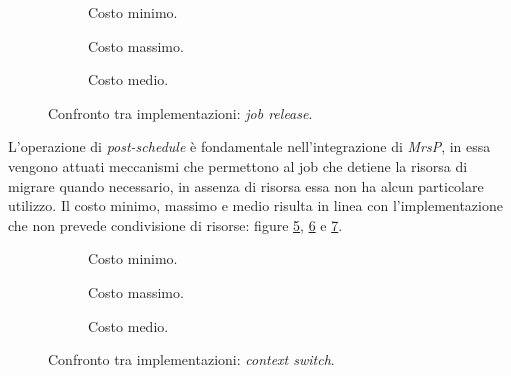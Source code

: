  \begin{figure}[htb]
    \centering
      \begin{subfigure}[b]{0.49\textwidth}
        \centering
        \resizebox{\linewidth}{!}\graficoReleaseMIN  
        \caption{Costo minimo.}
        \label{fig:releaseMin}
      \end{subfigure}
      \begin{subfigure}[b]{0.49\textwidth}
        \centering
        \resizebox{\linewidth}{!}\graficoReleaseMAX
        \caption{Costo massimo.}
        \label{fig:releaseMax}
      \end{subfigure}
      \begin{subfigure}[b]{0.49\textwidth}
        \centering
        \resizebox{\linewidth}{!}\graficoReleaseAVG
        \caption{Costo medio.}
        \label{fig:releaseAvg}
      \end{subfigure}

    \caption{Confronto tra implementazioni: \textit{job release}.}
    \label{fig:release}
  \end{figure}
        
\noindent L'operazione di \textit{post-schedule} è fondamentale nell'integrazione di \textit{MrsP}, in essa vengono attuati meccanismi che permettono al job che detiene la risorsa di migrare quando necessario, in assenza di risorsa essa non ha alcun particolare utilizzo. Il costo minimo, massimo e medio risulta in linea con l'implementazione che non prevede condivisione di risorse: figure \ref{fig:cxsMin}, \ref{fig:cxsMax} e \ref{fig:cxsAvg}.\\

  \begin{figure}[htb]
    \centering
      \begin{subfigure}[b]{0.49\textwidth}
        \centering
        \resizebox{\linewidth}{!}\graficoCxsMIN  
        \caption{Costo minimo.}
        \label{fig:cxsMin}
      \end{subfigure}
      \begin{subfigure}[b]{0.49\textwidth}
        \centering
        \resizebox{\linewidth}{!}\graficoCxsMAX
        \caption{Costo massimo.}
        \label{fig:cxsMax}
      \end{subfigure}
      \begin{subfigure}[b]{0.49\textwidth}
        \centering
        \resizebox{\linewidth}{!}\graficoCxsAVG
        \caption{Costo medio.}
        \label{fig:cxsAvg}
      \end{subfigure}

    \caption{Confronto tra implementazioni: \textit{context switch}.}
    \label{fig:cxs}
  \end{figure}

